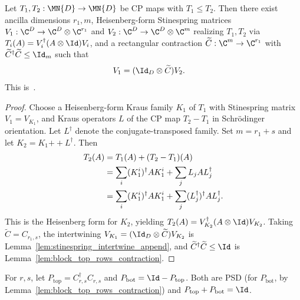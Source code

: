 \begin{theorem}\label{thm:cp_dominates_stinespring_contraction}
    \leanok
    Let $T_1,T_2:\MN{D}\to\MN{D}$ be CP maps with $T_1\le T_2$.
    Then there exist ancilla dimensions $r_1,m$, Heisenberg-form Stinespring
    matrices $V_1:\C^D\to\C^D\otimes\C^{r_1}$ and
    $V_2:\C^D\to\C^D\otimes\C^m$ realizing $T_1,T_2$ via
    $T_i(A)=V_i^\dagger(A\otimes\Id)V_i$, and a rectangular contraction
    $\widetilde C:\C^m\to\C^{r_1}$ with
    $\widetilde C^\dagger\widetilde C\le\Id_m$ such that
    \begin{align}
        V_1
        &=(\Id_D\otimes\widetilde C)V_2.
        \label{eq:representations_ordered_intertwining}
    \end{align}
    This is~\cite[Theorem~2.3]{Wolf2012Quantum}.
\end{theorem}

\begin{proof}\leanok
    Choose a Heisenberg-form Kraus family $K_1$ of $T_1$ with Stinespring
    matrix $V_1=V_{K_1}$, and Kraus operators $L$ of the CP map
    $T_2-T_1$ in Schr\"odinger orientation. Let $L^\dagger$ denote the
    conjugate-transposed family. Set $m=r_1+s$ and let
    $K_2=K_1\mathbin{+\!+}L^\dagger$. Then
    \begin{align}
        T_2(A)
        &=T_1(A)+(T_2-T_1)(A) \notag\\
        &=\sum_i(K_1^i)^\dagger A K_1^i+\sum_jL_j A L_j^\dagger \notag\\
        &=\sum_i(K_1^i)^\dagger A K_1^i
          +\sum_j(L_j^\dagger)^\dagger A L_j^\dagger.
        \notag
    \end{align}
    This is the Heisenberg form for $K_2$, yielding
    $T_2(A)=V_{K_2}^\dagger(A\otimes\Id)V_{K_2}$. Taking
    $\widetilde C=C_{r_1,s}$, the intertwining
    $V_{K_1}=(\Id_D\otimes\widetilde C)V_{K_2}$ is
    Lemma~\ref{lem:stinespring_intertwine_append}, and
    $\widetilde C^\dagger\widetilde C\le\Id$ is
    Lemma~\ref{lem:block_top_rows_contraction}.
\end{proof}

\begin{definition}
    \label{def:block_diag_projectors}
    \leanok
    For $r,s$, let $P_{\mathrm{top}}=C_{r,s}^\dagger C_{r,s}$ and
    $P_{\mathrm{bot}}=\Id-P_{\mathrm{top}}$. Both are PSD
    (for $P_{\mathrm{bot}}$, by Lemma~\ref{lem:block_top_rows_contraction})
    and $P_{\mathrm{top}}+P_{\mathrm{bot}}=\Id$.
\end{definition}


